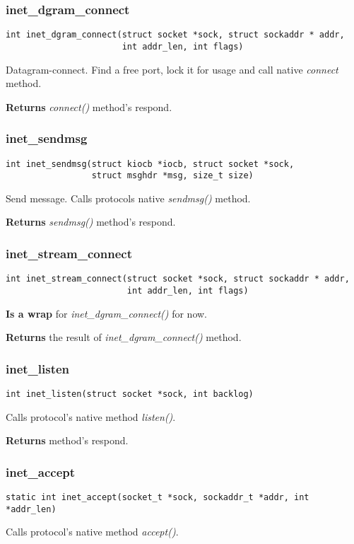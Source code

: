 \documentclass[12pt,a4paper]{article}
\begin{document}
\subsubsection{inet\_dgram\_connect}
\label{sec:embox_net_inet_dgram_connect}
\begin{verbatim}
int inet_dgram_connect(struct socket *sock, struct sockaddr * addr,
                       int addr_len, int flags)
\end{verbatim}
Datagram-connect. Find a free port, lock it for usage and call native
{\it connect} method.

{\bf Returns} {\it connect()} method's respond.

\subsubsection{inet\_sendmsg}
\label{sec:embox_net_inet_sendmsg}
\begin{verbatim}
int inet_sendmsg(struct kiocb *iocb, struct socket *sock,
                 struct msghdr *msg, size_t size)
\end{verbatim}
Send message. Calls protocols native {\it sendmsg()} method.

{\bf Returns} {\it sendmsg()} method's respond.


\subsubsection{inet\_stream\_connect}
\label{sec:af_inet_inet_stream_connect}
\begin{verbatim}
int inet_stream_connect(struct socket *sock, struct sockaddr * addr,
                        int addr_len, int flags)
\end{verbatim}
{\bf Is a wrap} for {\it inet\_dgram\_connect()} for now.

{\bf Returns} the result of {\it inet\_dgram\_connect()} method.

\subsubsection{inet\_listen}
\label{sec:af_inet_inet_listen}
\begin{verbatim}
int inet_listen(struct socket *sock, int backlog)
\end{verbatim}
Calls protocol's native method {\it listen()}.

{\bf Returns} method's respond.

\subsubsection{inet\_accept}
\label{sec:af_inet_inet_accept}
\begin{verbatim}
static int inet_accept(socket_t *sock, sockaddr_t *addr, int *addr_len)
\end{verbatim}
Calls protocol's native method {\it accept()}.
\end{document}
